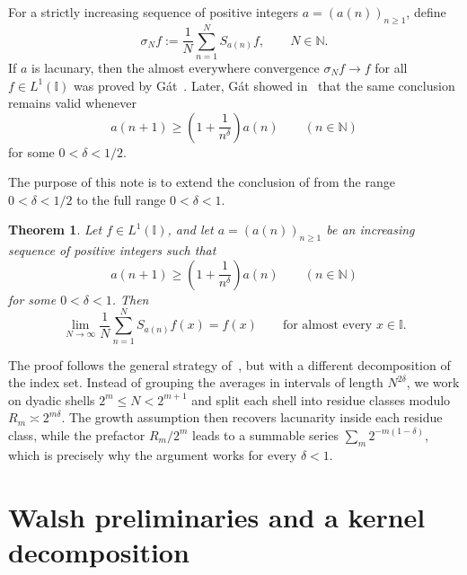\documentclass[11pt]{amsart}
\numberwithin{equation}{section}
\newtheorem{theorem}{Theorem}[section]
\theoremstyle{remark}
\begin{document}
For a strictly increasing sequence of positive integers $a=(a(n))_{n\ge1}$,
define 
\begin{equation}
\sigma_N f:=\frac1N\sum_{n=1}^N S_{a(n)}f,\qquad N\in\mathbb{N}.
\label{eq:sigma-def}
\end{equation}
If $a$ is lacunary, then the almost everywhere convergence $\sigma_N f\to f$
for all $f\in L^1(\mathbb{I})$ was proved by G\'at~\cite{Gat2010}. Later,
G\'at showed in~\cite{Gat2019} that the same conclusion remains valid
whenever 
\begin{equation}
a(n+1)\ge \left(1+\frac1{n^{\delta}}\right)a(n)\qquad (n\in\mathbb{N})
\label{eq:growth-old}
\end{equation}
for some $0<\delta<1/2$.

The purpose of this note is to extend the conclusion of \cite{Gat2019} from the range $0< \delta<1 / 2$ to the full range $0<\delta<1$.

\begin{theorem}
\label{thm:main} Let $f\in L^1(\mathbb{I})$, and let $a=(a(n))_{n\ge1}$ be
an increasing sequence of positive integers such that 
\begin{equation}
a(n+1)\ge \left(1+\frac1{n^{\delta}}\right)a(n)\qquad (n\in\mathbb{N})
\label{eq:growth}
\end{equation}
for some $0<\delta<1$. Then 
\begin{equation*}
\lim_{N\to\infty}\frac1N\sum_{n=1}^N S_{a(n)}f(x)=f(x) \qquad\text{for
almost every }x\in\mathbb{I}. 
\end{equation*}
\end{theorem}

The proof follows the general strategy of~\cite{Gat2019}, but with a
different decomposition of the index set. Instead of grouping the averages
in intervals of length $N^{2\delta}$, we work on dyadic shells $2^m\le
N<2^{m+1}$ and split each shell into residue classes modulo $R_m\asymp
2^{m\delta}$. The growth assumption then recovers lacunarity inside each
residue class, while the prefactor $R_m/2^m$ leads to a summable series $%
\sum_m 2^{-m(1-\delta)}$, which is precisely why the argument works for
every $\delta<1$.

\section{Walsh preliminaries and a kernel decomposition}
\end{document}
